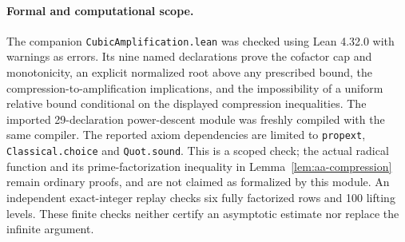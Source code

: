 \paragraph{Formal and computational scope.}
The companion \texttt{CubicAmplification.lean} was checked using Lean 4.32.0
with warnings as errors. Its nine named declarations prove the cofactor cap
and monotonicity, an explicit normalized root above any prescribed bound, the
compression-to-amplification implications, and the impossibility of a uniform
relative bound conditional on the displayed compression inequalities.
The imported 29-declaration power-descent module was freshly compiled with
the same compiler. The reported axiom dependencies are limited to
\texttt{propext}, \texttt{Classical.choice} and \texttt{Quot.sound}.
This is a scoped check; the actual radical function and its prime-factorization
inequality in Lemma~\ref{lem:aa-compression} remain ordinary proofs, and are
not claimed as formalized by this module. An independent exact-integer replay
checks six fully factorized rows and 100 lifting levels. These finite checks
neither certify an asymptotic estimate nor replace the infinite argument.
